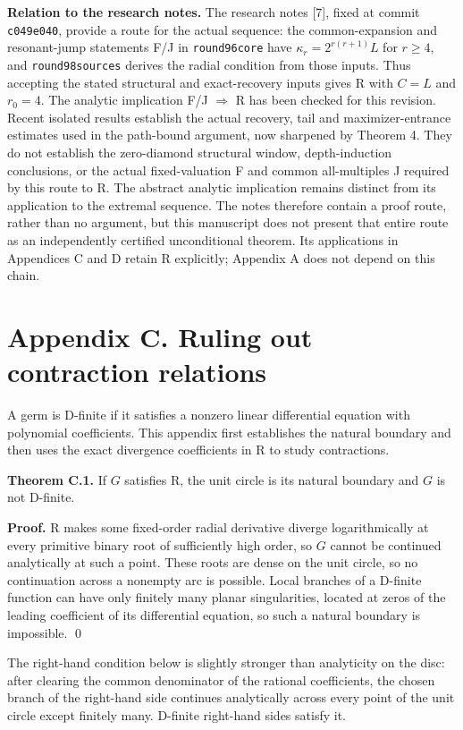 \documentclass[11pt]{article}
\begin{document}
\textbf{Relation to the research notes.} The research notes [7], fixed at commit \texttt{c049e040}, provide a route for the actual sequence: the common-expansion and resonant-jump statements F/J in \texttt{round96core} have $\kappa_r=2^{r(r+1)}L$ for $r\ge4$, and \texttt{round98sources} derives the radial condition from those inputs. Thus accepting the stated structural and exact-recovery inputs gives R with $C=L$ and $r_0=4$. The analytic implication F/J $\Rightarrow$ R has been checked for this revision. Recent isolated results establish the actual recovery, tail and maximizer-entrance estimates used in the path-bound argument, now sharpened by Theorem 4. They do not establish the zero-diamond structural window, depth-induction conclusions, or the actual fixed-valuation F and common all-multiples J required by this route to R. The abstract analytic implication remains distinct from its application to the extremal sequence. The notes therefore contain a proof route, rather than no argument, but this manuscript does not present that entire route as an independently certified unconditional theorem. Its applications in Appendices C and D retain R explicitly; Appendix A does not depend on this chain.

\section*{Appendix C. Ruling out contraction relations}
A germ is D-finite if it satisfies a nonzero linear differential equation with polynomial coefficients. This appendix first establishes the natural boundary and then uses the exact divergence coefficients in R to study contractions.

\textbf{Theorem C.1.} If $G$ satisfies R, the unit circle is its natural boundary and $G$ is not D-finite.

\textbf{Proof.} R makes some fixed-order radial derivative diverge logarithmically at every primitive binary root of sufficiently high order, so $G$ cannot be continued analytically at such a point. These roots are dense on the unit circle, so no continuation across a nonempty arc is possible. Local branches of a D-finite function can have only finitely many planar singularities, located at zeros of the leading coefficient of its differential equation, so such a natural boundary is impossible. \qed

The right-hand condition below is slightly stronger than analyticity on the disc: after clearing the common denominator of the rational coefficients, the chosen branch of the right-hand side continues analytically across every point of the unit circle except finitely many. D-finite right-hand sides satisfy it.
\end{document}
